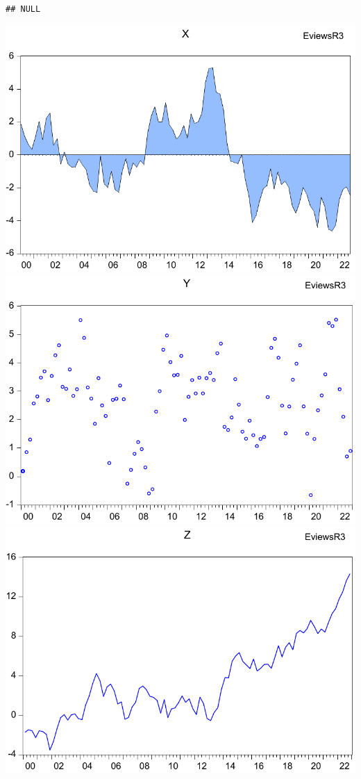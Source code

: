 \documentclass[
]{article}
\newenvironment{Shaded}{\begin{snugshade}}{\end{snugshade}}
\newcommand{\CommentTok}[1]{\textcolor[rgb]{0.56,0.35,0.01}{\textit{#1}}}
\newcommand{\ErrorTok}[1]{\textcolor[rgb]{0.64,0.00,0.00}{\textbf{#1}}}
\newcommand{\SpecialCharTok}[1]{\textcolor[rgb]{0.00,0.00,0.00}{#1}}
\begin{document}
\begin{verbatim}
## NULL
\end{verbatim}

\begin{Shaded}
\end{Shaded}

\begin{center}\includegraphics[width=0.2\linewidth]{test_files/figure-latex//import1-EviewsR3-GRAPH1} \includegraphics[width=0.2\linewidth]{test_files/figure-latex//import1-EviewsR3-GRAPH2} \includegraphics[width=0.2\linewidth]{test_files/figure-latex//import1-EviewsR3-GRAPH3} \end{center}
\end{document}
